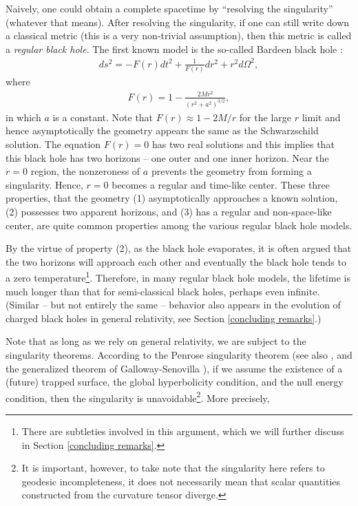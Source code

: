 \documentclass[12pt]{article}
\newcommand{\2}{$^2$}
\newcommand{\3}{$^3$}
\newcommand{\4}{$_4$}
\newcommand{\5}{$_5$}
\begin{document}
Naively, one could obtain a complete spacetime by ``resolving the singularity'' (whatever that means). After resolving the singularity, if one can still write down a classical metric (this is a very non-trivial assumption), then this metric is called a \emph{regular black hole}. The first known model is the so-called Bardeen black hole \cite{Bardeen}:
\begin{eqnarray}
ds^{2} = - F(r) dt^{2} + \frac{1}{F(r)} dr^{2} + r^{2} d\Omega^{2},
\end{eqnarray}
where
\begin{eqnarray}
F(r) = 1 - \frac{2Mr^{2}}{(r^{2} + a^{2})^{3/2}},
\end{eqnarray}
in which $a$ is a constant. 
Note that $F(r) \approx 1 - 2M/r$ for the large $r$ limit and hence asymptotically the geometry appears the same as the Schwarzschild solution. The equation $F(r) = 0$ has two real solutions and this implies that this black hole has two horizons -- one outer and one inner horizon. Near the $r = 0$ region, the nonzeroness of $a$ prevents the geometry  from forming a singularity. Hence, $r=0$ becomes a regular and time-like center. These three properties, that the geometry (1) asymptotically approaches a known solution, (2) possesses two apparent horizons, and (3) has a regular and non-space-like center, are quite common properties among the various regular black hole models. 

By the virtue of  property (2), as the black hole evaporates, it is often argued that the two horizons will approach each other and eventually the black hole tends to a zero temperature\footnote{There are subtleties involved in this argument, which we will further discuss in Section \ref{concluding remarks}.}. Therefore, in many regular black hole models, the lifetime is much longer than that for semi-classical black holes, perhaps even infinite. (Similar -- but not entirely the same -- behavior also appears in the evolution of charged black holes in general relativity, see Section \ref{concluding remarks}.)

Note that as long as we rely on general relativity, we are subject to the singularity theorems. According to the Penrose singularity theorem \cite{P} (see also \cite{HE}, and the generalized theorem of Galloway-Senovilla \cite{GS}), if we assume the existence of a (future) trapped surface, the global hyperbolicity condition, and the null energy condition, then the singularity is unavoidable\footnote{It is important, however, to take note that the singularity here refers to geodesic incompleteness, it does not necessarily mean that scalar quantities constructed from the curvature tensor diverge.}. More precisely, 
\end{document}
